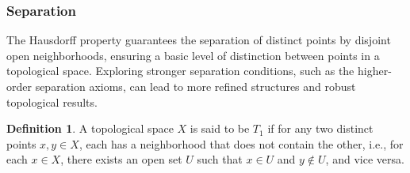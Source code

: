 \documentclass[12pt, reqno]{amsart}
\theoremstyle{definition}
\newtheorem{definition}[theorem]{Definition}
\newtheorem{example}[theorem]{Example}
\numberwithin{equation}{section}
\newcommand{\dR}{{\mathbb R}}
\begin{document}
\subsubsection{Separation}
The Hausdorff property guarantees the separation of distinct points by disjoint open neighborhoods, ensuring a basic level of distinction between points in a topological space. Exploring stronger separation conditions, such as the higher-order separation axioms, can lead to more refined structures and robust topological results.

\begin{definition}
A topological space $X$ is said to be $T_1$ if for any two distinct points $x, y \in X$, each has a neighborhood that does not contain the other, i.e., for each $x \in X$, there exists an open set $U$ such that $x \in U$ and $y \notin U$, and vice versa.
\end{definition}

\begin{comment}
\begin{example}
In the Euclidean space $\dR^n$ with the standard topology, for any two distinct points $x, y \in \dR^n$, there exist open neighborhoods $U$ of $x$ and $V$ of $y$ such that $x \in U$, $y \notin U$, and $y \in V$, $x \notin V$. This shows that $\dR^n$ satisfies the $T_1$ separation axiom.
\end{example}    


\begin{example}
    Consider the infinite-dimensional space \( C([0, 1]) \), the space of all continuous real-valued functions on \([0, 1]\), equipped with the topology of uniform convergence. For any two distinct points \( f, g \in C([0, 1]) \), there exist open neighborhoods \( U \) of \( f \) and \( V \) of \( g \) such that \( f \in U \), \( g \notin U \), and \( g \in V \), \( f \notin V \). 

    For instance, define \( U = \{h \in C([0, 1]) : \|h - f\| < \epsilon\} \) and \( V = \{h \in C([0, 1]) : \|h - g\| < \epsilon\} \), where \( \|h - f\| = \sup_{x \in [0, 1]} |h(x) - f(x)| \) is the uniform norm, and choose \( \epsilon > 0 \) small enough such that the neighborhoods \( U \) and \( V \) are disjoint. 

    This separation shows that \( C([0, 1]) \) satisfies the \( T_1 \) separation axiom, where distinct points (functions in this case) can be separated by open neighborhoods.
\end{example}
\end{comment}
\end{document}
